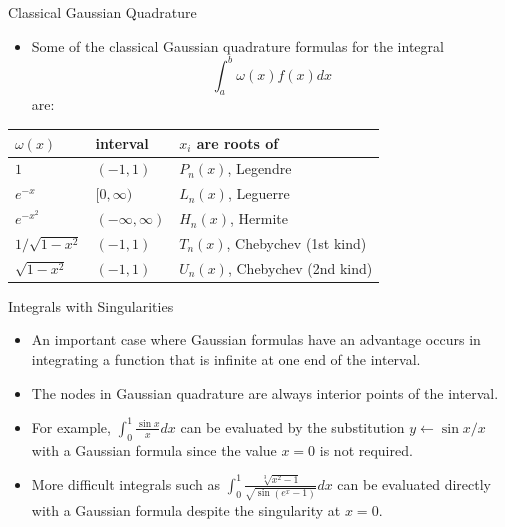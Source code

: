 \documentclass{beamer}
\newcommand{\beforeverb}{\footnotesize}
\newcommand{\afterverb}{\normalsize}
\begin{document}
\begin{frame}{Classical Gaussian Quadrature}
\begin{itemize}
\item Some of the classical Gaussian quadrature formulas for the integral
\[
\int_a^b \omega(x) f(x) dx
\]
are:
\end{itemize}
\begin{center}
\begin{tabular}{|l|l|l|}
\hline
 $\omega(x)$ & interval & $x_i$ are roots of \\
\hline
$1$ & $(-1,1)$ & $P_n(x)$, Legendre \\
$e^{-x}$ & $[0,\infty)$& $L_n(x)$, Leguerre \\
$e^{-x^2}$ & $(-\infty,\infty)$& $H_n(x)$, Hermite \\
$1/\sqrt{1-x^2}$ & $(-1,1)$ & $T_n(x)$, Chebychev  (1st kind)\\
$\sqrt{1-x^2}$ & $(-1,1)$ & $U_n(x)$, Chebychev   (2nd kind)	\\
\hline	
\end{tabular}
\end{center}

\end{frame}
\begin{frame}{Integrals with Singularities}
\begin{itemize}
\item An important case where Gaussian formulas have an advantage occurs in integrating a
function that is \alert{infinite at one end of the interval}.
\item The nodes in Gaussian quadrature are always \alert{interior points} of the interval.
\item For example,
$\int_0^1\frac{\sin x}{x} dx$ 
can be evaluated by the substitution $y\leftarrow \sin x/x$ with a Gaussian formula since the value $x=0$ is not required.
\item More difficult integrals such as 
$\int_0^1 \frac{\sqrt[3]{x^2-1}}{\sqrt{\sin(e^x-1)}} dx$
can be evaluated directly with a Gaussian formula despite the singularity at $x=0$.
\end{itemize}
\end{frame}
\end{document}
